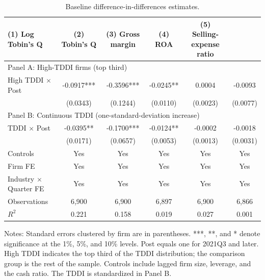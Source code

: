 \begin{table}[htbp]
\centering
\small
\setlength{\tabcolsep}{4pt}
\caption{Baseline difference-in-differences estimates.}
\label{tab:main}
\begin{threeparttable}
\begin{tabular}{lccccc}
\toprule
(1) Log Tobin's Q & (2) Tobin's Q & (3) Gross margin & (4) ROA & (5) Selling-expense ratio \\
\midrule
\multicolumn{6}{l}{Panel A: High-TDDI firms (top third)} \\
High TDDI $\times$ Post & -0.0917*** & -0.3596*** & -0.0245** & 0.0004 & -0.0093 \\
 & (0.0343) & (0.1244) & (0.0110) & (0.0023) & (0.0077) \\
\midrule
\multicolumn{6}{l}{Panel B: Continuous TDDI (one-standard-deviation increase)} \\
TDDI $\times$ Post & -0.0395** & -0.1700*** & -0.0124** & -0.0002 & -0.0018 \\
 & (0.0171) & (0.0657) & (0.0053) & (0.0013) & (0.0031) \\
\midrule
Controls & Yes & Yes & Yes & Yes & Yes \\
Firm FE & Yes & Yes & Yes & Yes & Yes \\
Industry $\times$ Quarter FE & Yes & Yes & Yes & Yes & Yes \\
Observations & 6,900 & 6,900 & 6,897 & 6,900 & 6,866 \\
$R^2$ & 0.221 & 0.158 & 0.019 & 0.027 & 0.001 \\
\bottomrule
\end{tabular}
\begin{tablenotes}[flushleft]
\footnotesize
\item Notes: Standard errors clustered by firm are in parentheses. ***, **, and * denote significance at the 1\%, 5\%, and 10\% levels. Post equals one for 2021Q3 and later. High TDDI indicates the top third of the TDDI distribution; the comparison group is the rest of the sample. Controls include lagged firm size, leverage, and the cash ratio. The TDDI is standardized in Panel B.
\end{tablenotes}
\end{threeparttable}
\end{table}
